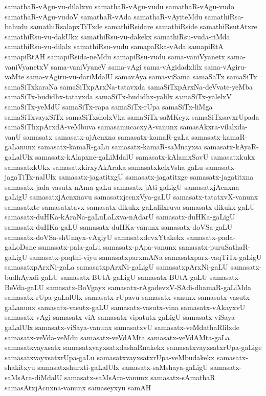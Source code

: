 {samathaR-vAgu-vu-dilalxvo
samathaR-vAgu-vudu
samathaR-vAgu-vudo
samathaR-vAgu-vudoV
samathaR-vAda
samathaR-vAyiteMdu
samathiRsa-bahudu
samathiRsalapxTiTxde
samathiRsidare
samathiRside
samathiRsutAtxre
samathiRsu-vu-dakUkx
samathiRsu-vu-dakekx
samathiRsu-vuda-riMda
samathiRsu-vu-dilalx
samathiRsu-vudu
samapaRka-vAda
samapiRtA
samapiRtAH
samapiRsida-neMdu
samapiRsu-vudu
sama-vaniVyanetx
sama-vaniVyanetxV
sama-vaniVyaneV
sama-vAgi
sama-vAgidadxlilx
sama-vAgiru-vaMte
sama-vAgiru-vu-dariMdalU
samavAya
sama-viSama
samaSaTx
samaSiTx
samaSiTxkaraNa
samaSiTxpArxNa-tatavxda
samaSiTxpArxNa-deVvate-yeMba
samaSiTx-budidhx-tatavxda
samaSiTx-budidhx-yalilx
samaSiTx-yalelxV
samaSiTx-yeMdU
samaSiTx-rapa
samaSiTx-rUpa
samaSiTx-liMga
samaSiTxvayxSiTx
samaSiTxsholxVka
samaSiTx-saMKeyx
samaSiTxsavxrUpada
samaSiThxpArxdA-veMbuva
samasamucacxyA-vanunx
samasAkxra-vilalxda-vanU
samasatx
samasatx-ajAcnxna
samasatx-kamaR-gaLa
samasatx-kamaR-gaLanunx
samasatx-kamaR-gaLu
samasatx-kamaR-saMnayxsa
samasatx-kAyaR-gaLalUlx
samasatx-kAlapxne-gaLiMdalU
samasatx-kAlamxSavU
samasatxkukx
samasatxkUkx
samasatxkirxyAkAraka
samasatxkelxVsha-gaLu
samasatx-jagaTiTx-nalUlx
samasatx-jagatitxgU
samasatx-jagatitxge
samasatx-jagatitxna
samasatx-jada-vasutx-nAma-gaLu
samasatx-jAti-gaLigU
samasatxjAcnxna-gaLigU
samasatxjAcnxnavu
samasatxjecnxVya-gaLU
samasatx-tatatxvX-vanunx
samasatxte
samasatxtavx
samasatx-dikukx-gaLalilxruva
samasatx-dikukx-gaLU
samasatx-duHKa-kAraNa-gaLuLaLxva-nAdarU
samasatx-duHKa-gaLigU
samasatx-duHKa-gaLU
samasatx-duHKa-vanunx
samasatx-doVSa-gaLU
samasatx-doVSa-shUnayx-vAgiyU
samasatxdevxYtakekx
samasatx-pada-gaLoDane
samasatx-pala-gaLu
samasatx-pApa-vanunx
samasatx-puruSathaR-gaLigU
samasatx-paqthi-viyu
samasatxparxmANa
samasatxparx-vaqTiTx-gaLigU
samasatxpArxNi-gaLa
samasatxpArxNi-gaLigU
samasatxpArxNi-gaLU
samasatx-budhAyxdi-gaLU
samasatx-BUtA-gaLigU
samasatx-BUtA-gaLU
samasatx-BeVda-gaLU
samasatx-BoVgayx
samasatx-rAgadevxV-SAdi-dhamaR-gaLiMda
samasatx-rUpa-gaLalUlx
samasatx-rUpavu
samasatx-vanunx
samasatx-vasutx-gaLanunx
samasatx-vasutx-gaLU
samasatx-vasutx-vina
samasatx-vAkayxvU
samasatx-vAgi
samasatx-viA
samasatx-vipatutx-gaLigU
samasatx-viSaya-gaLalUlx
samasatx-viSaya-vanunx
samasatxvU
samasatx-veMdathaRlilxde
samasatx-veVda-veMdu
samasatx-veVdAMta
samasatx-veVdAMta-gaLa
samasatxvayxsatx
samasatxvayxsatxdashaRnakekx
samasatxvayxsatxrUpa-gaLige
samasatxvayxsatxrUpa-gaLu
samasatxvayxsatxrUpa-veMbudakekx
samasatx-shakitxyu
samasatxshurxti-gaLalUlx
samasatx-saMshaya-gaLigU
samasatx-saMsAra-diMdalU
samasatx-saMsAra-vanunx
samasatx-sAmathaR
samasAtxjAcnxna-vanunx
samaseyxyu
samAH
}
